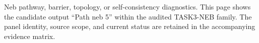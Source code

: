 Neb pathway, barrier, topology, or self-consistency diagnostics. This page shows the candidate output ``Path neb 5'' within the audited TASK3-NEB family. The panel identity, source scope, and current status are retained in the accompanying evidence matrix.

